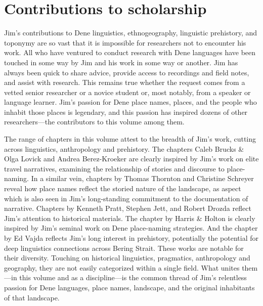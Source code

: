 \section{Contributions to scholarship}
Jim's contributions to Dene linguistics, ethnogeography, linguistic prehistory, and toponymy are so vast that it is impossible for researchers not to encounter his work. All who  have ventured to conduct research with Dene languages have been touched in some way by Jim and his work in some way or another. Jim has always been quick to share advice, provide access to recordings and field notes, and assist with research. This remains true whether the request comes from a vetted senior researcher or a novice student or, most notably, from a speaker or language learner. Jim's passion for Dene place names, places, and the people who inhabit those places is legendary, and this passion has inspired dozens of other researchers---the contributors to this volume among them.

The range of chapters in this volume attest to the breadth of Jim's work, cutting across linguistics, anthropology and prehistory. The chapters Caleb Brucks \& Olga Lovick and Andrea Berez-Kroeker are clearly inspired by Jim's work on elite travel narratives, examining the relationship of stories and discourse to place-naming. In a similar vein, chapters by Thomas Thornton and Christine Schreyer reveal how place names reflect  the storied nature of the landscape, as aspect which is also seen in Jim's long-standing commitment to the documentation of narrative. Chapters by Kenneth Pratt, Stephen Jett, and Robert Drozda  reflect Jim's attention to historical materials. The chapter by Harris \& Holton is clearly inspired by Jim's seminal work on Dene place-naming strategies. And the chapter by Ed Vajda reflects Jim's long interest in prehistory, potentially the potential for deep linguistics connections across Bering Strait. These works are notable for their diversity. Touching on historical linguistics, pragmatics, anthropology and geography, they are not easily categorized within a single field. What unites them---in this volume and as a discipline---is the common thread of Jim's relentless passion for Dene languages, place names, landscape, and the original inhabitants of that landscape.  
 
 



\label{intro-ch-end}
